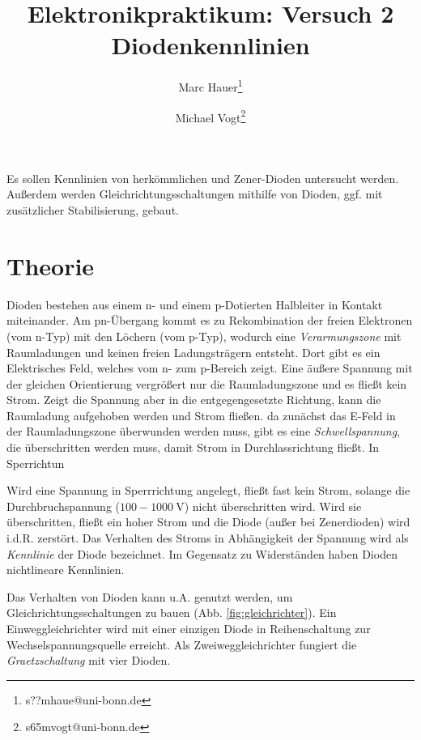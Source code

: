 \documentclass{article}
\title{Elektronikpraktikum: Versuch 2 \\Diodenkennlinien}
\author[1]{Marc Hauer\thanks{s??mhaue@uni-bonn.de}}
\author[1]{Michael Vogt\thanks{s65mvogt@uni-bonn.de}}
\affil[1]{Uni Bonn}
\newcommand{\defc}{black}
\newcommand{\colorT}[2][blue]{\color{#1}{#2}\color{\defc}}
\newcommand{\todo}[1]{\colorT[red]{\textbf{(#1)}}}
\begin{document}
\maketitle
\tableofcontents
\newpage
{}

\pagestyle{fancy}
\fancyhead[R]{\thepage}
\fancyhead[L]{\leftmark}


Es sollen Kennlinien von herkömmlichen und Zener-Dioden untersucht werden.
Außerdem werden Gleichrichtungsschaltungen mithilfe von Dioden, ggf. mit zusätzlicher Stabilisierung, gebaut.

\section{Theorie}
\todo{Physik hinter Dioden genauer erklären?}
Dioden bestehen aus einem n- und einem p-Dotierten Halbleiter in Kontakt miteinander. Am pn-Übergang kommt es zu Rekombination
der freien Elektronen (vom n-Typ) mit den Löchern (vom p-Typ), wodurch eine \textit{Verarmungszone}
mit Raumladungen und keinen freien Ladungsträgern entsteht. Dort gibt es ein Elektrisches Feld, welches vom n- zum p-Bereich zeigt.
Eine äußere Spannung mit der gleichen Orientierung vergrößert nur die Raumladungszone und es fließt kein Strom.
Zeigt die Spannung aber in die entgegengesetzte Richtung, kann die Raumladung aufgehoben werden und Strom fließen.
da zunächst das E-Feld in der Raumladungszone überwunden werden muss, gibt es eine \textit{Schwellspannung},
die überschritten werden muss, damit Strom in Durchlassrichtung fließt. In Sperrichtun

Wird eine Spannung in Sperrrichtung angelegt, fließt fast kein Strom, solange die Durchbruchspannung ($100-\SI{1000}{\V}$)
nicht überschritten wird. Wird sie überschritten, fließt ein hoher Strom und die Diode (außer bei Zenerdioden) wird i.d.R. zerstört.
Das Verhalten des Stroms in Abhängigkeit der Spannung wird als
\textit{Kennlinie} der Diode bezeichnet. Im Gegensatz zu Widerständen haben Dioden nichtlineare Kennlinien.

Das Verhalten von Dioden kann u.A. genutzt werden, um Gleichrichtungsschaltungen zu bauen (Abb. \ref{fig:gleichrichter}).
Ein Einweggleichrichter wird mit einer einzigen Diode in Reihenschaltung zur Wechselspannungsquelle erreicht.
Als Zweiweggleichrichter fungiert die \textit{Graetzschaltung} mit vier Dioden. 
\end{document}
